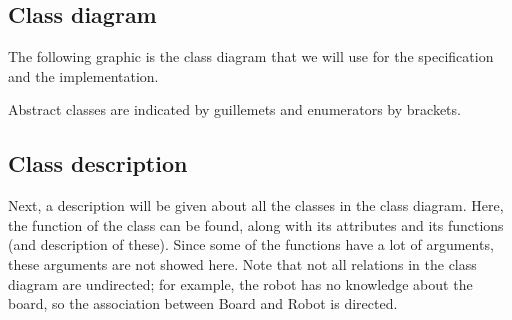 \subsection{Class diagram}
	The following graphic is the class diagram that we will use for the specification and the implementation.

	
    Abstract classes are indicated by guillemets and enumerators by brackets.

\subsection{Class description}
    Next, a description will be given about all the classes in the class diagram. Here, the function of the class can be found, along with its attributes and its functions (and description of these). Since some of the functions have a lot of arguments, these arguments are not showed here. Note that not all relations in the class diagram are undirected; for example, the robot has no knowledge about the board, so the association between Board and Robot is directed. 

